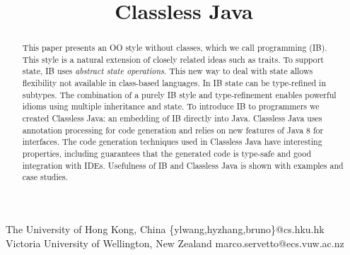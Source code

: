 \documentclass[10pt,numbers]{sigplanconf}
\begin{document}
\toappear{}

\setlength{\pdfpageheight}{\paperheight}
\setlength{\pdfpagewidth}{\paperwidth}




\title{Classless Java}

\vspace{-20pt}
           {The University of Hong Kong, China}
           {\{ylwang,hyzhang,bruno\}@cs.hku.hk}
          {Victoria University of Wellington, New Zealand}
          {marco.servetto@ecs.vuw.ac.nz}

\maketitle
\vspace{-20pt}

\begin{abstract}
  This paper presents an OO style without classes, which we call \interfacebased \objectoriented
  programming (IB). This style is a natural extension of closely
  related ideas such as traits.
  To support state, IB uses \emph{abstract state
    operations}. This
  new way to deal with state allows flexibility not
  available in class-based languages.  In IB state
  can be type-refined in subtypes. The combination of a
  purely IB style and type-refinement enables
  powerful idioms using multiple inheritance and state. To introduce
  IB to programmers we created Classless Java: an embedding of IB
  directly into Java. Classless Java uses annotation processing for
  code generation and relies on new features of Java 8 for
  interfaces. The code generation techniques used in Classless Java
  have interesting properties, including guarantees that
  the generated code is type-safe and good integration with IDEs.
  Usefulness of IB and Classless Java is shown with
  examples and case studies.
\end{abstract}
\end{document}

